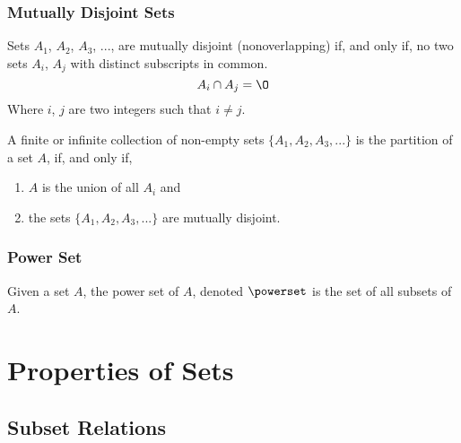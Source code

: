 \documentclass[11pt]{article}
\begin{document}
\subsubsection{Mutually Disjoint Sets}
\begin{definition}\label{def:mutually-disjoint}
    Sets $A_1$, $A_2$, $A_3$, ..., are mutually disjoint (nonoverlapping)
    if, and only if, no two sets $A_i$, $A_j$ with distinct subscripts
    in common.
    \begin{equation*}
        A_i \cap A_j = \O
    \end{equation*}
    Where $i$, $j$ are two integers such that $i \neq j$.
\end{definition}

\begin{definition}[Partition]\label{def:partition}
    A finite or infinite collection of non-empty sets $\{ A_1, A_2, A_3, ... \}$
    is the partition of a set $A$, if, and only if,
    \begin{enumerate}
        \item $A$ is the union of all $A_i$ and
        \item the sets $\{ A_1, A_2, A_3, ... \}$ are mutually disjoint.
    \end{enumerate}
\end{definition}

\subsubsection{Power Set}

\begin{definition}\label{def:power-set}
    Given a set $A$, the power set of $A$, denoted $\powerset$ is the set of all subsets of $A$.
\end{definition}



\section{Properties of Sets}

\subsection{Subset Relations}
\end{document}
